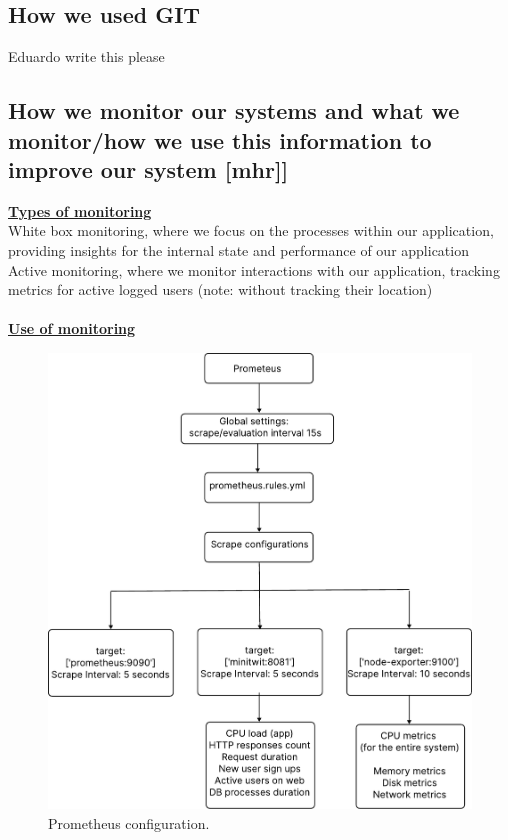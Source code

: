 \documentclass{article}
\begin{document}
\subsection{How we used GIT}
Eduardo write this please

\subsection{How we monitor our systems and what we monitor/how we use this information to improve our system [mhr]]}

\noindent \textbf{\underline{Types of monitoring}} 
\\White box monitoring, where we focus on the processes within our application, providing insights for the internal state and performance of our application\\
Active monitoring, where we monitor interactions with our application, tracking metrics for active logged users (note: without tracking their location)
\\
\\
\noindent \textbf{\underline{Use of monitoring}} 

\begin{figure}[ht]
    \centering
    \includegraphics[width=1.0\textwidth]{./pdfs/prometheus_configuration.pdf} 
    \caption{Prometheus configuration.}
    \label{fig:Prometheus configuration}
\end{figure}
\end{document}
